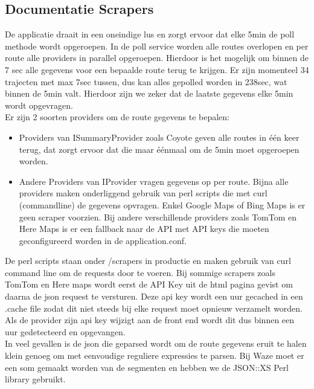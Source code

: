 \documentclass[a4paper]{article}
\begin{document}
\subsection{Documentatie Scrapers}

De applicatie draait in een oneindige lus en zorgt ervoor dat elke 5min de poll methode wordt opgeroepen. In de poll service worden alle routes overlopen en per route alle providers in parallel opgeroepen. Hierdoor is het mogelijk om binnen de 7 sec alle gegevens voor een bepaalde route terug te krijgen. Er zijn momenteel 34 trajecten met max 7sec tussen, dus kan alles gepolled worden in 238sec, wat binnen de 5min valt. Hierdoor zijn we zeker dat de laatste gegevens elke 5min wordt opgevragen. \\ 

Er zijn 2 soorten providers om de route gegevens te bepalen:

\begin{itemize}
\item Providers van ISummaryProvider zoals Coyote geven alle routes in één keer terug, dat zorgt ervoor dat die maar éénmaal om de 5min moet opgeroepen worden.
\item Andere Providers van IProvider vragen gegevens op per route. Bijna alle providers maken onderliggend gebruik van perl scripts die met curl (commandline) de gegevens opvragen. Enkel Google Maps of Bing Maps is er geen scraper voorzien. Bij andere verschillende providers zoals TomTom en Here Maps is er een fallback naar de API met API keys die moeten geconfigureerd worden in de application.conf. 
\end{itemize}

De perl scripts staan onder /scrapers in productie en maken gebruik van curl command line om de requests door te voeren. Bij sommige scrapers zoals TomTom en Here maps wordt eerst de API Key uit de html pagina gevist om daarna de json request te versturen. Deze api key wordt een uur gecached in een .cache file zodat dit niet steeds bij elke request moet opnieuw verzamelt worden. Als de provider zijn api key wijzigt aan de front end wordt dit dus binnen een uur gedetecteerd en opgevangen. \\

In veel gevallen is de json die geparsed wordt om de route gegevens eruit te halen klein genoeg om met eenvoudige reguliere expressies te parsen. Bij Waze moet er een som gemaakt worden van de segmenten en hebben we de JSON::XS Perl library gebruikt. \\
\end{document}
